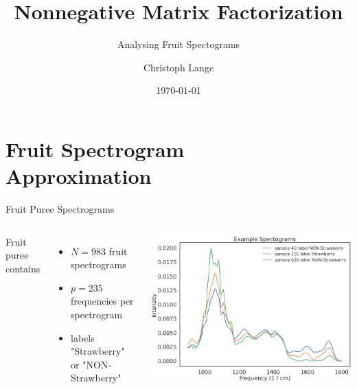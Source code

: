 \documentclass[aspectratio=169]{beamer}
\title{Nonnegative Matrix Factorization }
\subtitle{Analysing Fruit Spectograms}
\author{Christoph Lange}
\date{\today}
\begin{document}

\begin{frame}
	\maketitle %

\end{frame}


\section{Fruit Spectrogram  \\ Approximation} %


\begin{frame}{Fruit Puree Spectrograms}
	\begin{columns}
		Fruit puree  \href{https://data.mendeley.com/datasets/frrv2yd9rg/1}{\color{brown}{dataset}} contains
			 \begin{itemize}
				\item  $N = 983$ fruit spectrograms 
				\item $p = 235$ frequencies per spectrogram
				\item labels "Strawberry" or "NON-Strawberry"
			\end{itemize}
		
			\includegraphics[width=\linewidth]{images/three_examples.png}
	\end{columns}

\end{frame}
\end{document}
